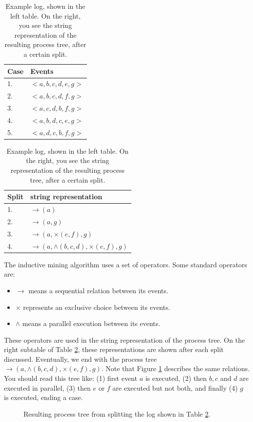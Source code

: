 \documentclass[a4paper,11pt]{article}
\begin{document}
\begin{table}[H]
\centering
\begin{tabular}{l|l}
Case & Events          \\
\hline
1.   & $<a,b,c,d,e,g>$ \\
2.   & $<a,b,c,d,f,g>$ \\
3.   & $<a,c,d,b,f,g>$ \\
4.   & $<a,b,d,c,e,g>$ \\
5.   & $<a,d,c,b,f,g>$
\end{tabular}
\quad
\begin{tabular}{l|l}
Split & string representation  \\
\hline
1.     & $\rightarrow(a)$  \\
2.     & $\rightarrow(a, g)$    \\
3.     & $\rightarrow(a, \times(e,f), g)$    \\
4.     & $\rightarrow(a, \wedge(b,c,d),\times(e,f), g)$   \\    
\end{tabular}
\caption{Example log, shown in the left table. On the right, you see the string representation of the resulting process tree, after a certain split.}
\label{table:inducExampleLog}
\end{table}

The inductive mining algorithm uses a set of operators. Some standard operators are:
\begin{itemize}
\item $\rightarrow$ means a sequential relation between its events.
\item $\times$ represents an exclusive choice between its events.
\item $\wedge$ means a parallel execution between its events.
\end{itemize}

These operators are used in the string representation of the process tree. On the right subtable of Table \ref{table:inducExampleLog}, these representations are shown after each split discussed. Eventually, we end with the process tree $\rightarrow(a, \wedge (b,c,d),\times(e,f),g)$. Note that Figure \ref{figure:processTree} describes the same relations. You should read this tree like: (1) first event $a$ is executed, (2) then $b,c$ and $d$ are executed in parallel, (3) then $e$ or $f$ are executed but not both, and finally (4) $g$ is executed, ending a case. 

\begin{figure}[H]
\centering
{}
\caption{Resulting process tree from splitting the log shown in Table \ref{table:inducExampleLog}.}
\label{figure:processTree}
\end{figure}
\end{document}
